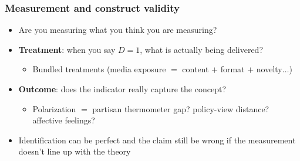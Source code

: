 \begin{frame}
\frametitle{Measurement and construct validity}
\centering

\begin{itemize}[<+->]
\item Are you measuring what you think you are measuring?
\vspace{6pt}
\item \textbf{Treatment}: when you say $D = 1$, what is actually being delivered?
  \begin{itemize}
  \item Bundled treatments (media exposure $=$ content $+$ format $+$ novelty$\ldots$)
  \end{itemize}
\vspace{6pt}
\item \textbf{Outcome}: does the indicator really capture the concept?
  \begin{itemize}
  \item Polarization $=$ partisan thermometer gap? policy-view distance? affective feelings?
  \end{itemize}
\vspace{8pt}
\item Identification can be perfect and the claim still be wrong if the measurement doesn't line up with the theory
\end{itemize}

\end{frame}

